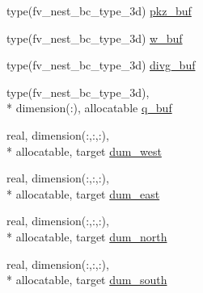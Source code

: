 \begin{DoxyCompactItemize}
type(fv\-\_\-nest\-\_\-bc\-\_\-type\-\_\-3d) \hyperlink{classfv__nesting__mod_acddea4741cfe6597c8dd8a6a8d5eea24}{pkz\-\_\-buf}
\item 
type(fv\-\_\-nest\-\_\-bc\-\_\-type\-\_\-3d) \hyperlink{classfv__nesting__mod_a41d3f0c81bc4af38520dd7eab1469baf}{w\-\_\-buf}
\item 
type(fv\-\_\-nest\-\_\-bc\-\_\-type\-\_\-3d) \hyperlink{classfv__nesting__mod_a69d8bb3285146bc62f53d8e4ea1a41a3}{divg\-\_\-buf}
\item 
type(fv\-\_\-nest\-\_\-bc\-\_\-type\-\_\-3d), \\*
dimension(\-:), allocatable \hyperlink{classfv__nesting__mod_acc3bcff2425434680476295e500da917}{q\-\_\-buf}
\item 
real, dimension(\-:,\-:,\-:), \\*
allocatable, target \hyperlink{classfv__nesting__mod_aabec65a89859cf6fddbdb0dd22eca70c}{dum\-\_\-west}
\item 
real, dimension(\-:,\-:,\-:), \\*
allocatable, target \hyperlink{classfv__nesting__mod_ac0091b561b404cccf4fe21b7ceb23056}{dum\-\_\-east}
\item 
real, dimension(\-:,\-:,\-:), \\*
allocatable, target \hyperlink{classfv__nesting__mod_af3594b28f181611d0f7a3c884981f724}{dum\-\_\-north}
\item 
real, dimension(\-:,\-:,\-:), \\*
allocatable, target \hyperlink{classfv__nesting__mod_aec160f65b40c51f270de9995522c6af5}{dum\-\_\-south}
\end{DoxyCompactItemize}
